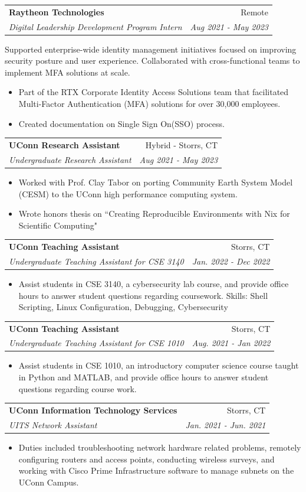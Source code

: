 \documentclass[a4paper,11pt]{article}
\makeatletter
\newcommand{\resumeItemCustom}[2]{
  \item\small{
    \textbf{#1}{ #2 \vspace{-2pt}}
  }
}
\newcommand{\resumeSubheading}[4]{
  \vspace{-1pt}\item
    \begin{tabular*}{0.97\textwidth}{l@{\extracolsep{\fill}}r}
      \textbf{#1} & #2 \\
      \textit{#3} & \textit{#4} \\
    \end{tabular*}\vspace{-5pt}
}
\newcommand{\resumeItemListStart}{\begin{itemize}}
\newcommand{\resumeItemListEnd}{\end{itemize}\vspace{-5pt}}
\makeatother
\begin{document}
    \vspace{2pt}
    \resumeSubheading{Raytheon Technologies}{Remote}
    {Digital Leadership Development Program Intern}{Aug 2021 - May 2023}
    
    Supported enterprise-wide identity management initiatives focused on improving security posture and user experience. Collaborated with cross-functional teams to implement MFA solutions at scale.
    \vspace{-3pt}
    \resumeItemListStart
    \resumeItemCustom{}{Part of the RTX Corporate Identity Access Solutions team that facilitated Multi-Factor Authentication (MFA) solutions for over 30,000 employees.}
    \resumeItemCustom{}{Created documentation on Single Sign On(SSO) process.}
    \resumeItemListEnd
    
\vspace{2pt}
    \resumeSubheading{UConn Research Assistant}{Hybrid - Storrs, CT}
    {Undergraduate Research Assistant}{Aug 2021 - May 2023}
    \resumeItemListStart
    \resumeItemCustom{}{Worked with Prof. Clay Tabor on porting Community Earth System Model (CESM) to the UConn high performance computing system.}
    \resumeItemCustom{}{Wrote honors thesis on ``Creating Reproducible Environments with Nix for Scientific Computing"}
    \resumeItemListEnd
    
    \vspace{6pt}
    \resumeSubheading{UConn Teaching Assistant}{Storrs, CT}
    {Undergraduate Teaching Assistant for CSE 3140}{Jan. 2022 - Dec 2022}
    \resumeItemListStart
    \resumeItemCustom{}{Assist students in CSE 3140, a cybersecurity lab course, and provide office hours to answer student questions regarding coursework. Skills: Shell Scripting, Linux Configuration, Debugging, Cybersecurity}
    \resumeItemListEnd
    
    \vspace{2pt}
    \resumeSubheading{UConn Teaching Assistant}{Storrs, CT}
    {Undergraduate Teaching Assistant for CSE 1010}{Aug. 2021 - Jan 2022}
    \resumeItemListStart
    \resumeItemCustom{}{Assist students in CSE 1010, an introductory computer science course taught in Python and MATLAB, and provide office hours to answer student questions regarding course work.}
    \resumeItemListEnd
    
\vspace{2pt}
    \resumeSubheading
		{UConn Information Technology Services}{Storrs, CT}
		{UITS Network Assistant}{ Jan. 2021 - Jun. 2021}
		\resumeItemListStart
        \resumeItemCustom{}{Duties included troubleshooting network hardware related problems, remotely configuring routers and access points, conducting wireless surveys, and working with Cisco Prime Infrastructure software to manage subnets on the UConn Campus.}
		\resumeItemListEnd
\end{document}
